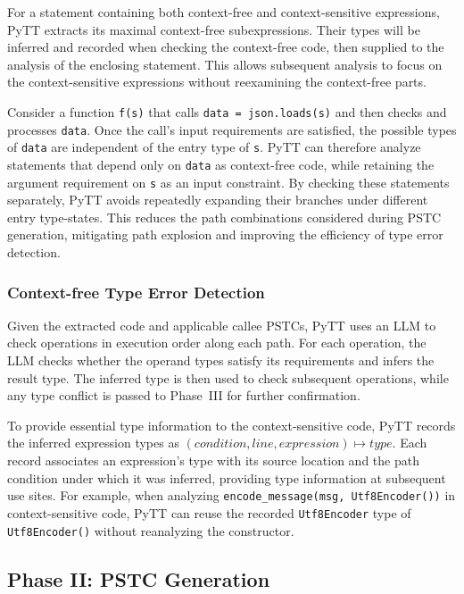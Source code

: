 For a statement containing both context-free and context-sensitive
expressions, PyTT extracts its maximal context-free subexpressions.
Their types will be inferred and recorded when checking the context-free
code, then supplied to the analysis of the enclosing statement.
This allows subsequent analysis to focus on the context-sensitive
expressions without reexamining the context-free parts.

Consider a function \texttt{f(s)} that calls
\texttt{data = json.loads(s)} and then checks and processes
\texttt{data}.
Once the call's input requirements are satisfied, the possible types
of \texttt{data} are independent of the entry type of \texttt{s}.
PyTT can therefore analyze statements that depend only on
\texttt{data} as context-free code, while retaining the argument
requirement on \texttt{s} as an input constraint.
By checking these statements separately, PyTT avoids repeatedly
expanding their branches under different entry type-states.
This reduces the path combinations considered during PSTC generation,
mitigating path explosion and improving the efficiency of type error
detection.

\subsubsection{Context-free Type Error Detection}

Given the extracted code and applicable callee PSTCs, PyTT uses an LLM
to check operations in execution order along each path.
For each operation, the LLM checks whether the operand types satisfy
its requirements and infers the result type.
The inferred type is then used to check subsequent operations,
while any type conflict is passed to Phase~III for further confirmation.

To provide essential type information  to the context-sensitive code,
PyTT records the inferred expression types as
$(\mathit{condition}, \mathit{line}, \mathit{expression}) \mapsto \mathit{type}$.
Each record associates an expression's type with its source location
and the path condition under which it was inferred, providing type
information at subsequent use sites.
For example, when analyzing
\texttt{encode\_message(msg, Utf8Encoder())} in context-sensitive code, PyTT can reuse the
recorded \texttt{Utf8Encoder} type of \texttt{Utf8Encoder()}
without reanalyzing the constructor.


\subsection{Phase II: PSTC Generation}
\label{sec:pstc-generation}

